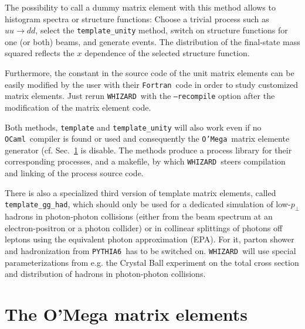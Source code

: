 \documentclass[12pt]{book}
\newcommand{\ttt}[1]{\texttt{#1}}
\newcommand{\whizard}{\ttt{WHIZARD}}
\newcommand{\oMega}{\ttt{O'Mega}}
\newcommand{\pythiasix}{\ttt{PYTHIA6}}
\newcommand{\fortran}{\ttt{Fortran}}
\newcommand{\ocaml}{\ttt{OCaml}}
\begin{document}
The possibility to call a dummy matrix element with this method allows
to histogram spectra or structure functions: Choose a trivial process
such as $uu\to dd$, select the \ttt{template\_unity} method, switch
on structure functions for one (or both) beams, and generate events.
The distribution of the final-state mass squared reflects the $x$
dependence of the selected structure function.

Furthermore, the constant in the source code of the unit matrix
elements can be easily modified by the user with their \fortran\ code
in order to study customized matrix elements. Just rerun
\whizard\ with the \ttt{--recompile} option after the modification of
the matrix element code.

Both methods, \ttt{template} and \ttt{template\_unity} will also work
even if no \ocaml\ compiler is found or used and consequently the
\oMega\ matrix elemente generator (cf. Sec.~\ref{sec:omega_me} is
disable. The methods produce a process library for their corresponding
processes, and a makefile, by  which \whizard\ steers compilation and
linking of the process source code.

There is also a specialized third version of template matrix elements,
called \ttt{template\_gg\_had}, which should only be used for a
dedicated simulation of low-$p_\perp$ hadrons in photon-photon
collisions (either from the beam spectrum at an electron-positron or a
photon collider) or in collinear splittings of photons off leptons
using the equivalent photon approximation (EPA). For it, parton shower
and hadronization from \pythiasix\ has to be switched
on. \whizard\ will use special parameterizations from e.g. the Crystal
Ball experiment on the total cross section and distribution of hadrons
in photon-photon collisions.


\section{The O'Mega matrix elements}
\label{sec:omega_me}
\end{document}
